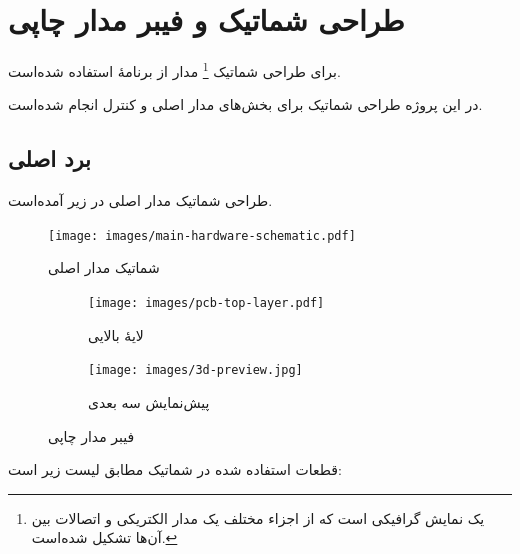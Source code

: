 \section{طراحی شماتیک و فیبر مدار چاپی}\label{sec3:chap5}
برای طراحی شماتیک \footnote{یک نمایش گرافیکی است که از اجزاء مختلف یک مدار الکتریکی و اتصالات بین آن‌ها تشکیل شده‌است.}
 مدار از برنامهٔ
استفاده شده‌است.

در این پروژه طراحی شماتیک برای بخش‌های مدار اصلی و کنترل انجام شده‌است.

\subsection{برد اصلی}\label{subsec1:sec3:chap5}
طراحی شماتیک مدار اصلی در زیر آمده‌است.
\begin{figure}[!h]
	\begin{center}
		\texttt{[image: images/main-hardware-schematic.pdf]}
	\end{center}
	\caption{شماتیک مدار اصلی}
	\label{fig1:sec3:chap5}
\end{figure}

\begin{figure}[!h]
	\centering
	\footnotesize
	\begin{subfigure}[t]{0.50\linewidth}
		\centering
		\texttt{[image: images/pcb-top-layer.pdf]}
		\caption{لایهٔ بالایی}
		\label{subfig1:fig2:sec3:chap5}
	\end{subfigure}
	\begin{subfigure}[t]{0.44\linewidth}
		\centering
		\texttt{[image: images/3d-preview.jpg]}
		\caption{پیش‌نمایش سه بعدی}
		\label{subfig2:fig2:sec3:chap5}
	\end{subfigure}
	\normalsize
	\label{fig2:sec3:chap5}
	\caption{فیبر مدار چاپی}
\end{figure}

قطعات استفاده شده در شماتیک مطابق لیست زیر است:

